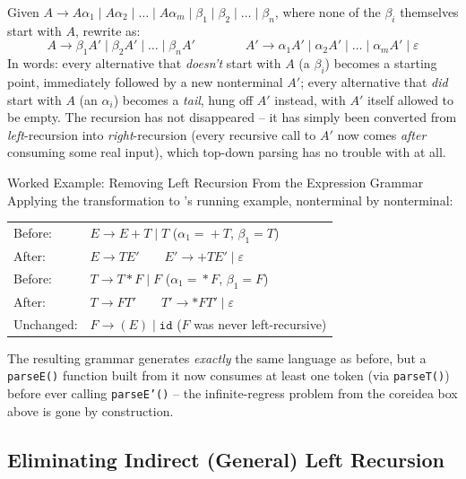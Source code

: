 \documentclass[full-course-notes.tex]{subfiles}
\begin{document}
\begin{coreidea}
Given $A \to A\alpha_1 \mid A\alpha_2 \mid \dots \mid A\alpha_m \mid \beta_1 \mid \beta_2 \mid
\dots \mid \beta_n$, where none of the $\beta_i$ themselves start with $A$, rewrite as:
\[
A \to \beta_1 A' \mid \beta_2 A' \mid \dots \mid \beta_n A' \qquad\qquad
A' \to \alpha_1 A' \mid \alpha_2 A' \mid \dots \mid \alpha_m A' \mid \varepsilon
\]
In words: every alternative that \emph{doesn't} start with $A$ (a $\beta_i$) becomes a starting
point, immediately followed by a new nonterminal $A'$; every alternative that \emph{did} start
with $A$ (an $\alpha_i$) becomes a \emph{tail}, hung off $A'$ instead, with $A'$ itself allowed
to be empty. The recursion has not disappeared -- it has simply been converted from
\emph{left}-recursion into \emph{right}-recursion (every recursive call to $A'$ now comes
\emph{after} consuming some real input), which top-down parsing has no trouble with at all.
\end{coreidea}

\begin{examplebox}{Worked Example: Removing Left Recursion From the Expression Grammar}
Applying the transformation to 's running example, nonterminal by nonterminal:
\begin{center}
\ttfamily
\begin{tabular}{@{}ll@{}}
Before: & $E \to E + T \mid T$ \qquad\qquad ($\alpha_1 = {}+T$, $\beta_1 = T$) \\
After: & $E \to T E' \qquad E' \to {+} T E' \mid \varepsilon$ \\[6pt]
Before: & $T \to T * F \mid F$ \qquad\qquad ($\alpha_1 = {}*F$, $\beta_1 = F$) \\
After: & $T \to F T' \qquad T' \to {*} F T' \mid \varepsilon$ \\[6pt]
Unchanged: & $F \to ( E ) \mid \texttt{id}$ \qquad ($F$ was never left-recursive)
\end{tabular}
\end{center}
The resulting grammar generates \emph{exactly} the same language as before, but a
\texttt{parseE()} function built from it now consumes at least one token (via
\texttt{parseT()}) before ever calling \texttt{parseE'()} -- the infinite-regress problem from
the coreidea box above is gone by construction.
\end{examplebox}

\subsection{Eliminating Indirect (General) Left Recursion}
\label{sec:l8-left-recursion-indirect}
\end{document}
